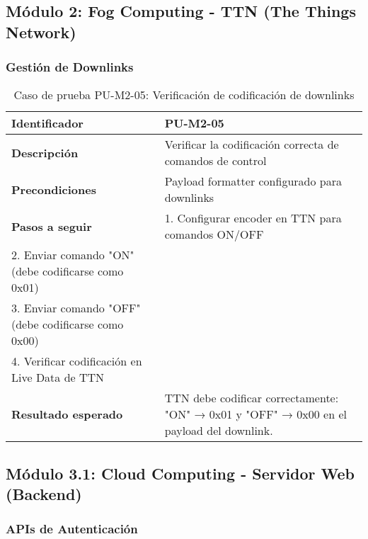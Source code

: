 \subsection{Módulo 2: Fog Computing - TTN (The Things Network)}


\subsubsection{Gestión de Downlinks}


\begin{table}[H]
\centering
\begin{tabular}{|l|p{10cm}|}
\hline
\textbf{Identificador} & PU-M2-05 \\ \hline
\textbf{Descripción} & Verificar la codificación correcta de comandos de control \\ \hline
\textbf{Precondiciones} & Payload formatter configurado para downlinks \\ \hline
\textbf{Pasos a seguir} & 
1. Configurar encoder en TTN para comandos ON/OFF \\
2. Enviar comando "ON" (debe codificarse como 0x01) \\
3. Enviar comando "OFF" (debe codificarse como 0x00) \\
4. Verificar codificación en Live Data de TTN \\ \hline 
\textbf{Resultado esperado} & TTN debe codificar correctamente: "ON" → 0x01 y "OFF" → 0x00 en el payload del downlink. \\ \hline
\end{tabular}
\caption{Caso de prueba PU-M2-05: Verificación de codificación de downlinks}
\label{tab:pu-m2-05}
\end{table}

\subsection{Módulo 3.1: Cloud Computing - Servidor Web (Backend)}

\subsubsection{APIs de Autenticación}

